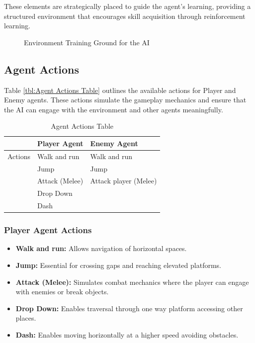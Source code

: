 \documentclass[12pt,oneside,openright,a4paper]{cpe-english-project}
\begin{document}
These elements are strategically placed to guide the agent’s learning, providing a structured environment that encourages skill acquisition through reinforcement learning.
\begin{figure}[H]
\centering
{}
\caption{Environment Training Ground for the AI}\label{fig:EnvironmentDesign}
\end{figure}
\subsection{Agent Actions}
Table \ref{tbl:Agent Actions Table} outlines the available actions for Player and Enemy agents. These actions simulate the gameplay mechanics and ensure that the AI can engage with the environment and other agents meaningfully.
\begin{table}[H]
\caption{Agent Actions Table}\label{tbl:Agent Actions and Capabilities}
\begin{tabular}{|l|l|l|} \hline
& \textbf{Player Agent} & \textbf{Enemy Agent} \\ \hline
Actions & Walk and run & Walk and run \\ 
& Jump & Jump \\ 
& Attack (Melee) & Attack player (Melee)  \\ 
& Drop Down &  \\
& Dash &  \\ \hline
\end{tabular}
\end{table}
\subsubsection{Player Agent Actions}
\begin{itemize}
\item  \textbf{Walk and run:} Allows navigation of horizontal spaces.
\item  \textbf{Jump:} Essential for crossing gaps and reaching elevated platforms.
\item  \textbf{Attack (Melee):} Simulates combat mechanics where the player can engage with enemies or break objects.
\item  \textbf{Drop Down:} Enables traversal through one way platform accessing other places.
\item  \textbf{Dash:} Enables moving horizontally at a higher speed avoiding obstacles.
\end{itemize}
\end{document}
